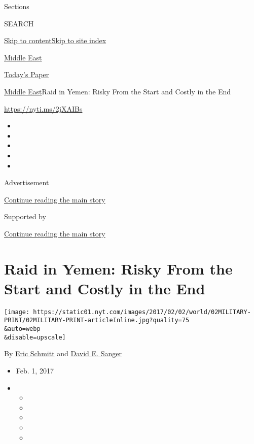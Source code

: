 Sections

SEARCH

\protect\hyperlink{site-content}{Skip to
content}\protect\hyperlink{site-index}{Skip to site index}

\href{https://www.nytimes.com/section/world/middleeast}{Middle East}

\href{https://myaccount.nytimes.com/auth/login?response_type=cookie\&client_id=vi}{}

\href{https://www.nytimes.com/section/todayspaper}{Today's Paper}

\href{/section/world/middleeast}{Middle East}\textbar{}Raid in Yemen:
Risky From the Start and Costly in the End

\url{https://nyti.ms/2jXAIBs}

\begin{itemize}
\item
\item
\item
\item
\item
\end{itemize}

Advertisement

\protect\hyperlink{after-top}{Continue reading the main story}

Supported by

\protect\hyperlink{after-sponsor}{Continue reading the main story}

\hypertarget{raid-in-yemen-risky-from-the-start-and-costly-in-the-end}{%
\section{Raid in Yemen: Risky From the Start and Costly in the
End}\label{raid-in-yemen-risky-from-the-start-and-costly-in-the-end}}

\texttt{[image: https://static01.nyt.com/images/2017/02/02/world/02MILITARY-PRINT/02MILITARY-PRINT-articleInline.jpg?quality=75\\\&auto=webp\\\&disable=upscale]}

By \href{http://www.nytimes.com/by/eric-schmitt}{Eric Schmitt} and
\href{http://www.nytimes.com/by/david-e-sanger}{David E. Sanger}

\begin{itemize}
\item
  Feb. 1, 2017
\item
  \begin{itemize}
  \item
  \item
  \item
  \item
  \item
  \end{itemize}
\end{itemize}

